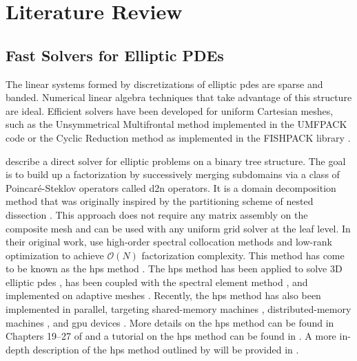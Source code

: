 \section{Literature Review}

\subsection{Fast Solvers for Elliptic PDEs}

The linear systems formed by discretizations of elliptic \gls{pdes} are sparse and banded. Numerical linear algebra techniques that take advantage of this structure are ideal. Efficient solvers have been developed for uniform Cartesian meshes, such as the Unsymmetrical Multifrontal method implemented in the UMFPACK code \citep{davis2004algorithm} or the Cyclic Reduction method \citep{swarztrauber1974direct} as implemented in the FISHPACK library \citep{swarztrauber1999fishpack,adams2016fishpack90}.

\citet{gillman2014direct} describe a direct solver for elliptic problems on a binary tree structure. The goal is to build up a factorization by successively merging subdomains via a class of Poincar\'e-Steklov operators \citep{quarteroni1991theory} called \gls{d2n} operators. It is a domain decomposition method that was originally inspired by the partitioning scheme of nested dissection \citep{george1973nested,lipton1979generalized}. This approach does not require any matrix assembly on the composite mesh and can be used with any uniform grid solver at the leaf level. In their original work, \citet{gillman2014direct} use high-order spectral collocation methods and low-rank optimization to achieve $\mathcal O(N)$ factorization complexity. This method has come to be known as the \gls{hps} method \citep{martinsson2015hierarchical}. The \gls{hps} method has been applied to solve 3D elliptic \gls{pdes} \citep{hao2016direct}, has been coupled with the spectral element method \citep{fortunato2020ultraspherical}, and implemented on adaptive meshes \citep{babb2018accelerated, geldermans2019adaptive,chipman2024fast}. Recently, the \gls{hps} method has also been implemented in parallel, targeting shared-memory machines \citep{beams2020parallel}, distributed-memory machines \citep{yesypenko2022parallel}, and \gls{gpu} devices \citep{yesypenko2022gpu}. More details on the \gls{hps} method can be found in Chapters 19--27 of \citep{martinsson2019fast} and a tutorial on the \gls{hps} method can be found in \citep{martinsson2015hierarchical}. A more in-depth description of the \gls{hps} method outlined by \citet{gillman2014direct} will be provided in .

